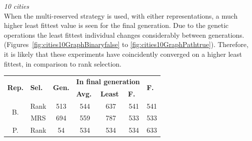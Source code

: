 \documentclass[10pt,a4paper,openbib]{article}
\begin{document}
\begin{multicols}{2}
\noindent \textit{10 cities}\\

\noindent When the multi-reserved strategy is used, with either representations, a much higher least fittest value is seen for the final generation. Due to the genetic operations the least fittest individual changes considerably between generations. (Figures~\ref{fig:cities10GraphBinaryfalse} to \ref{fig:cities10GraphPathtrue}). Therefore, it is likely that these experiments have coincidently converged on a higher least fittest, in comparison to rank selection. \\

\begin{table}[H]
\centering
\begin{tabular}{|c|c|c|c|c|c|c|}
\hline
\multicolumn{1}{|l|}{\multirow{2}{*}{\textbf{Rep.}}} & \multicolumn{1}{l|}{\multirow{2}{*}{\textbf{Sel.}}} & \multicolumn{1}{l|}{\multirow{2}{*}{\textbf{Gen.}}} & \multicolumn{3}{c|}{\textbf{In final generation}}                                                                & \multicolumn{1}{l|}{\multirow{2}{*}{\textbf{F.}}} \\ \cline{4-6}
\multicolumn{1}{|l|}{}                               & \multicolumn{1}{l|}{}                               & \multicolumn{1}{l|}{}                               & \multicolumn{1}{l|}{\textbf{Avg.}} & \multicolumn{1}{l|}{\textbf{Least}} & \multicolumn{1}{l|}{\textbf{F.}} & \multicolumn{1}{l|}{}                                  \\ \hline
\multirow{2}{*}{B.}                                  & Rank                                                &513                                                  & 544                                & 637                                 & 541                                   & 541                                                    \\ \cline{2-7} 
                                                     & MRS                                                & 694                                                 & 559                                & 787                                 & 533                                   & 533                                                    \\ \hline
\multirow{2}{*}{P.}                                  & Rank                                                & 54                                                  & 534                                & 534                                 & 534                                   & 633                                                    \\ \cline{2-7} 

\end{tabular}
\end{table}
\end{multicols}
\end{document}
